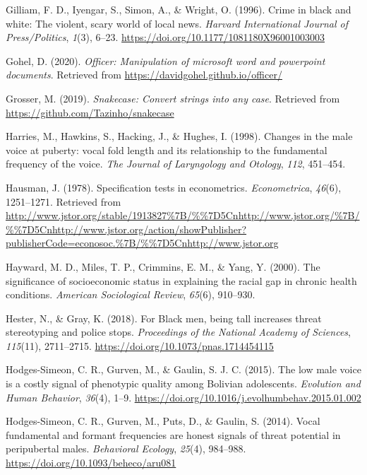 \documentclass[
  english,
  man, noextraspace,floatsintext]{apa6}
\newlength{\cslhangindent}
\newenvironment{cslreferences}%
  {\setlength{\parindent}{0pt}%
  \everypar{\setlength{\hangindent}{\cslhangindent}}\ignorespaces}%
  {\par}
\begin{document}
\begin{cslreferences}
\leavevmode\hypertarget{ref-Gilliam1996}{}%
Gilliam, F. D., Iyengar, S., Simon, A., \& Wright, O. (1996). Crime in black and white: The violent, scary world of local news. \emph{Harvard International Journal of Press/Politics}, \emph{1}(3), 6--23. \url{https://doi.org/10.1177/1081180X96001003003}

\leavevmode\hypertarget{ref-R-officer}{}%
Gohel, D. (2020). \emph{Officer: Manipulation of microsoft word and powerpoint documents}. Retrieved from \url{https://davidgohel.github.io/officer/}

\leavevmode\hypertarget{ref-R-snakecase}{}%
Grosser, M. (2019). \emph{Snakecase: Convert strings into any case}. Retrieved from \url{https://github.com/Tazinho/snakecase}

\leavevmode\hypertarget{ref-Harries1998}{}%
Harries, M., Hawkins, S., Hacking, J., \& Hughes, I. (1998). Changes in the male voice at puberty: vocal fold length and its relationship to the fundamental frequency of the voice. \emph{The Journal of Laryngology and Otology}, \emph{112}, 451--454.

\leavevmode\hypertarget{ref-Hausman1978}{}%
Hausman, J. (1978). Specification tests in econometrics. \emph{Econometrica}, \emph{46}(6), 1251--1271. Retrieved from \url{http://www.jstor.org/stable/1913827\%7B/\%\%7D5Cnhttp://www.jstor.org/\%7B/\%\%7D5Cnhttp://www.jstor.org/action/showPublisher?publisherCode=econosoc.\%7B/\%\%7D5Cnhttp://www.jstor.org}

\leavevmode\hypertarget{ref-Hayward2000}{}%
Hayward, M. D., Miles, T. P., Crimmins, E. M., \& Yang, Y. (2000). The significance of socioeconomic status in explaining the racial gap in chronic health conditions. \emph{American Sociological Review}, \emph{65}(6), 910--930.

\leavevmode\hypertarget{ref-Hester2018}{}%
Hester, N., \& Gray, K. (2018). For Black men, being tall increases threat stereotyping and police stops. \emph{Proceedings of the National Academy of Sciences}, \emph{115}(11), 2711--2715. \url{https://doi.org/10.1073/pnas.1714454115}

\leavevmode\hypertarget{ref-Hodges-Simeon2015}{}%
Hodges-Simeon, C. R., Gurven, M., \& Gaulin, S. J. C. (2015). The low male voice is a costly signal of phenotypic quality among Bolivian adolescents. \emph{Evolution and Human Behavior}, \emph{36}(4), 1--9. \url{https://doi.org/10.1016/j.evolhumbehav.2015.01.002}

\leavevmode\hypertarget{ref-Hodges-Simeon2014}{}%
Hodges-Simeon, C. R., Gurven, M., Puts, D., \& Gaulin, S. (2014). Vocal fundamental and formant frequencies are honest signals of threat potential in peripubertal males. \emph{Behavioral Ecology}, \emph{25}(4), 984--988. \url{https://doi.org/10.1093/beheco/aru081}


\end{cslreferences}
\end{document}
